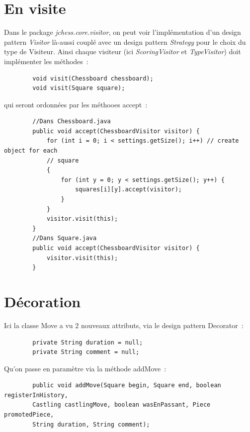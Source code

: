 \documentclass{article}
\begin{document}
	\section{En visite}
	\label{sec:En visite}
	Dans le package \emph{jchess.core.visitor}, on peut voir l'implémentation d'un design pattern \emph{Visitor} là-aussi couplé avec un design pattern \emph{Strategy} pour le choix du type de Visiteur. Ainsi chaque visiteur (ici \emph{ScoringVisitor} et \emph{TypeVisitor}) doit implémenter les méthodes~:
	\begin{verbatim}
		void visit(Chessboard chessboard);
		void visit(Square square);
	\end{verbatim}
	qui seront ordonnées par les méthooes accept~:
	\begin{verbatim}
		//Dans Chessboard.java
		public void accept(ChessboardVisitor visitor) {
			for (int i = 0; i < settings.getSize(); i++) // create object for each
			// square
			{
				for (int y = 0; y < settings.getSize(); y++) {
					squares[i][y].accept(visitor);
				}
			}
			visitor.visit(this);
		}
		//Dans Square.java
		public void accept(ChessboardVisitor visitor) {
			visitor.visit(this);
		}
	\end{verbatim}

	\section{Décoration}
	\label{sec:Decoration}
	Ici la classe Move a vu 2 nouveaux attributs, via le design pattern Decorator~:
	\begin{verbatim}
		private String duration = null;
		private String comment = null;
	\end{verbatim}
	Qu'on passe en paramètre via la méthode addMove~:
	\begin{verbatim}
		public void addMove(Square begin, Square end, boolean registerInHistory,
		Castling castlingMove, boolean wasEnPassant, Piece promotedPiece,
		String duration, String comment);
	\end{verbatim}
\end{document}

